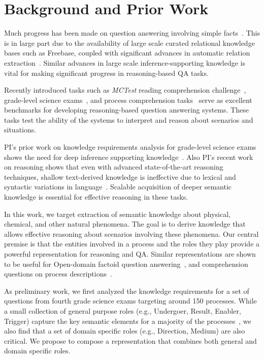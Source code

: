 \section{Background and Prior Work}

Much progress has been made on question answering involving simple facts~\cite{berant2013semantic,fader2014open,bordes2014open,reddy2014large}. 
This is in large part due to the availability of large scale curated relational knowledge bases such as Freebase, coupled with significant advances in automatic relation extraction~\cite{schmitz2012open,carlson2010toward,suchanek2007yago}. Similar advances in large scale inference-supporting knowledge is vital for making significant progress in reasoning-based QA tasks. 

Recently introduced tasks such as {\em MCTest} reading comprehension challenge~\cite{richardson2013mctest}, grade-level science exams~\cite{clark2015elementary}, and process comprehension tasks~\cite{berantSrikumar14} serve as excellent benchmarks for developing reasoning-based question answering systems. These tasks test the ability of the systems to interpret and reason about scenarios and situations.

PI's prior work on knowledge requirements analysis for grade-level science exams shows the need for deep inference supporting knowledge~\cite{chb2013:akbc,clark2014:akbc}.
Also PI's recent work on reasoning shows that even with advanced state-of-the-art reasoning techniques, shallow text-derived knowledge is ineffective due to lexical and syntactic variations in language~\cite{khot2015:emlnlp}. Scalable acquisition of deeper semantic knowledge is essential for effective reasoning in these tasks. 

In this work, we target extraction of semantic knowledge about physical, chemical, and other natural phenomena.
The goal is to derive knowledge that allows effective reasoning about scenarios involving these phenomena. 
Our central premise is that the entities involved in a process and the roles they play provide a powerful representation for reasoning and QA. 
Similar representations are shown to be useful for Open-domain factoid question answering~\cite{shen2007using,pizzato2008indexing}, 
and comprehension questions on process descriptions~\cite{berantSrikumar14}.

As preliminary work, we first analyzed the knowledge requirements for a set of questions from fourth grade science exams targeting around 150 processes. 
While a small collection of general purpose roles (e.g., Undergoer, Result, Enabler, Trigger) capture the key semantic elements for a 
majority of the processes~\cite{louvan2015:kcap}, we also find that a set of domain specific roles (e.g., Direction, Medium) are also critical. We propose to compose a representation that combines both general and domain specific roles. 



